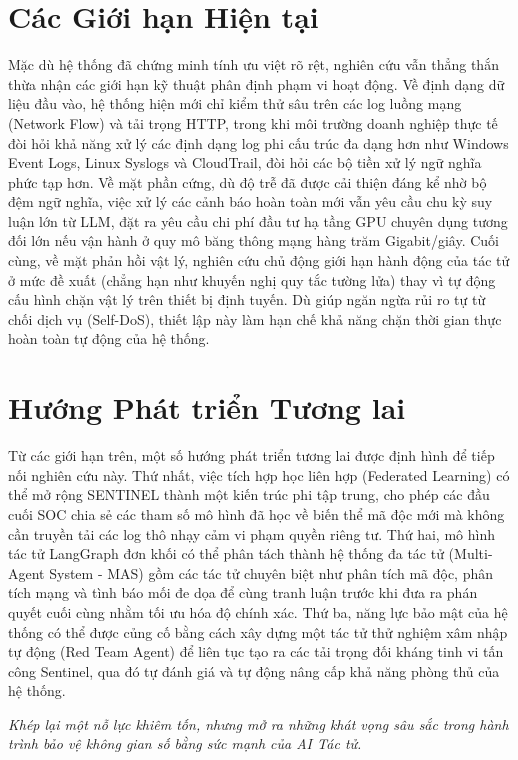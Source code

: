 \section{Các Giới hạn Hiện tại}
Mặc dù hệ thống đã chứng minh tính ưu việt rõ rệt, nghiên cứu vẫn thẳng thắn thừa nhận các giới hạn kỹ thuật phân định phạm vi hoạt động. Về định dạng dữ liệu đầu vào, hệ thống hiện mới chỉ kiểm thử sâu trên các log luồng mạng (Network Flow) và tải trọng HTTP, trong khi môi trường doanh nghiệp thực tế đòi hỏi khả năng xử lý các định dạng log phi cấu trúc đa dạng hơn như Windows Event Logs, Linux Syslogs và CloudTrail, đòi hỏi các bộ tiền xử lý ngữ nghĩa phức tạp hơn. Về mặt phần cứng, dù độ trễ đã được cải thiện đáng kể nhờ bộ đệm ngữ nghĩa, việc xử lý các cảnh báo hoàn toàn mới vẫn yêu cầu chu kỳ suy luận lớn từ LLM, đặt ra yêu cầu chi phí đầu tư hạ tầng GPU chuyên dụng tương đối lớn nếu vận hành ở quy mô băng thông mạng hàng trăm Gigabit/giây. Cuối cùng, về mặt phản hồi vật lý, nghiên cứu chủ động giới hạn hành động của tác tử ở mức đề xuất (chẳng hạn như khuyến nghị quy tắc tường lửa) thay vì tự động cấu hình chặn vật lý trên thiết bị định tuyến. Dù giúp ngăn ngừa rủi ro tự từ chối dịch vụ (Self-DoS), thiết lập này làm hạn chế khả năng chặn thời gian thực hoàn toàn tự động của hệ thống.

\section{Hướng Phát triển Tương lai}
Từ các giới hạn trên, một số hướng phát triển tương lai được định hình để tiếp nối nghiên cứu này. Thứ nhất, việc tích hợp học liên hợp (Federated Learning) có thể mở rộng SENTINEL thành một kiến trúc phi tập trung, cho phép các đầu cuối SOC chia sẻ các tham số mô hình đã học về biến thể mã độc mới mà không cần truyền tải các log thô nhạy cảm vi phạm quyền riêng tư. Thứ hai, mô hình tác tử LangGraph đơn khối có thể phân tách thành hệ thống đa tác tử (Multi-Agent System - MAS) gồm các tác tử chuyên biệt như phân tích mã độc, phân tích mạng và tình báo mối đe dọa để cùng tranh luận trước khi đưa ra phán quyết cuối cùng nhằm tối ưu hóa độ chính xác. Thứ ba, năng lực bảo mật của hệ thống có thể được củng cố bằng cách xây dựng một tác tử thử nghiệm xâm nhập tự động (Red Team Agent) để liên tục tạo ra các tải trọng đối kháng tinh vi tấn công Sentinel, qua đó tự đánh giá và tự động nâng cấp khả năng phòng thủ của hệ thống.

\vspace{1cm}
\begin{flushright}
    \textit{Khép lại một nỗ lực khiêm tốn, nhưng mở ra những khát vọng sâu sắc trong hành trình bảo vệ không gian số bằng sức mạnh của AI Tác tử.}
\end{flushright}
